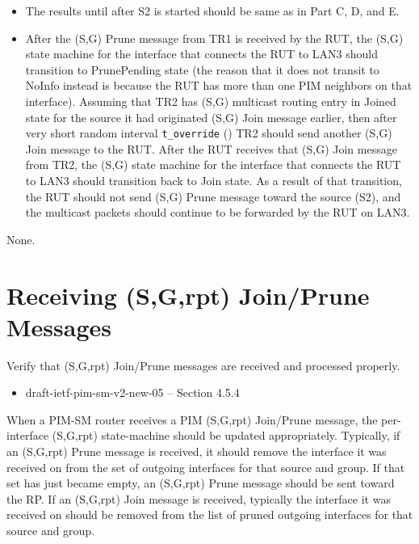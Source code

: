 \documentclass[11pt]{report}
\begin{document}

\begin{itemize}

  \item The results until after S2 is started should be same as in
  Part C, D, and E.

  \item After the (S,G) Prune message from TR1 is received by the RUT,
  the (S,G) state machine for the interface that connects the RUT to
  LAN3 should transition to PrunePending state (the reason that it does
  not transit to NoInfo instead is because the RUT has more than one PIM
  neighbors on that interface).
  Assuming that TR2 has (S,G) multicast routing entry in Joined state
  for the source it had originated (S,G) Join message earlier, then after
  very short random interval \verb=t_override= ({\PimsmTOverride}) TR2
  should send another (S,G) Join message to the RUT.
  After the RUT receives that (S,G) Join message from TR2,
  the (S,G) state machine for the interface that connects the RUT to
  LAN3 should transition back to Join state.
  As a result of that transition, the RUT should not send (S,G) Prune
  message toward the source (S2), and the multicast packets should continue
  to be forwarded by the RUT on LAN3.

\end{itemize}

None.

\newpage
\section{Receiving (S,G,rpt) Join/Prune Messages}

Verify that (S,G,rpt) Join/Prune messages are received and processed
properly.

\begin{itemize}
  \item draft-ietf-pim-sm-v2-new-05 -- Section 4.5.4
\end{itemize}

When a PIM-SM router receives a PIM (S,G,rpt) Join/Prune message, the
per-interface (S,G,rpt) state-machine should be updated appropriately.
Typically, if an (S,G,rpt) Prune message is received, it should
remove the interface it was received on from the set of outgoing interfaces
for that source and group. If that set has just became empty, an (S,G,rpt)
Prune message should be sent toward the RP.
If an (S,G,rpt) Join message is received, typically the interface it was
received on should be removed from the list of pruned outgoing interfaces for
that source and group.
\end{document}
